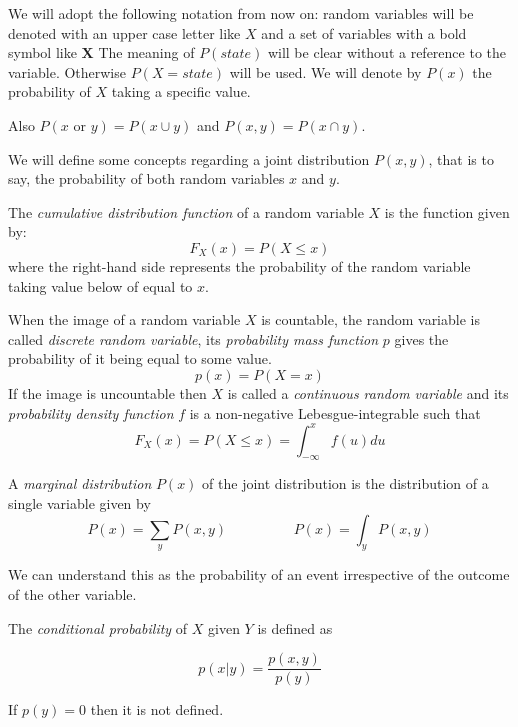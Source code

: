 \documentclass[oneside,openright,titlepage,numbers=noenddot,openany,headinclude,footinclude=true,
  cleardoublepage=empty,abstractoff,BCOR=5mm,paper=a4,fontsize=12pt]{scrreprt}
\begin{document}
We will adopt the following notation from now on: random variables will be
denoted with an upper case letter like \(X\) and a set of variables with a
bold symbol like \(\bm{X}\) The meaning of \(P(state)\) will be clear without a reference to the variable.
Otherwise \(P(X = state)\) will be used.
We will denote by \(P(x)\) the probability of \(X\) taking a specific value.

Also \(P(x \text{ or } y) = P(x \cup y)\) and \(P(x,y) = P(x \cap y)\).

We will define some concepts regarding a joint distribution \(P(x,y)\), that is
to say, the probability of both random variables \(x\) and \(y\).

\begin{definition}
The \emph{cumulative distribution function} of a random variable \(X\) is the
function given by:
\[
F_X (x) = P(X \leq x)
\]
where the right-hand side represents the probability of the random variable
taking value below of equal to \(x\).
\end{definition}

\begin{definition}
When the image of a random variable \(X\) is countable, the random variable is called
\emph{discrete random variable}, its \emph{probability mass function} \(p\) gives the
probability of it being equal to some value.
\[
p(x) = P(X = x)
\]
If the image is uncountable then \(X\) is called a \emph{continuous random
  variable} and its \emph{probability density function} \(f\) is a non-negative
Lebesgue-integrable such that
\[
F_X(x) = P(X \leq x) = \int_{-\infty}^x f(u) du
\]
\end{definition}

\begin{definition}
A \emph{marginal distribution} \(P(x)\) of the joint distribution is the
distribution of a single variable given by
\[
P(x) = \sum_y P(x,y) \hspace{2cm} P(x) = \int_y P(x,y)
\]
\end{definition}

We can understand this as the probability of an event irrespective of the outcome
of the other variable.

\begin{definition}
The \emph{conditional probability} of \(X\) given \(Y\) is defined as

\[
p(x|y) = \frac{p(x,y)}{p(y)}
\]

If \(p(y) = 0\) then it is not defined.
\end{definition}
\end{document}
